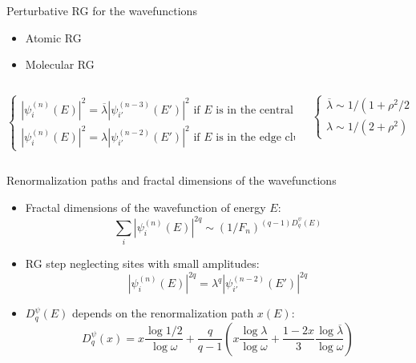 \documentclass[xcolor=x11names,compress,professionalfonts]{beamer}
\renewcommand{\(}{\begin{columns}}
\renewcommand{\)}{\end{columns}}
\newcommand{\<}[1]{\begin{column}{#1}}
\renewcommand{\>}{\end{column}}
\newcommand{\lb}{\ensuremath{\overline{\lambda}}}
\begin{document}
\begin{frame}{Perturbative RG for the wavefunctions}
	\begin{itemize}

		\item Atomic RG
			
		\item Molecular RG
			
	\end{itemize}
\begin{columns}
	\begin{column}{9cm}
	\[
	\begin{cases}
		|\psi_i^{(n)}(E)|^2 = \lb |\psi_{i'}^{(n-3)}(E')|^2 \text{~if $E$ is in the central cluster}\\
		|\psi_i^{(n)}(E)|^2 = \lambda |\psi_{i'}^{(n-2)}(E')|^2 \text{~if }E\text{~is in the edge clusters}
	\end{cases}
	\]
	\end{column}
	\begin{column}{3cm}
	\[
	\begin{cases}
		\lb \sim  1/(1+\rho^2/2) \\
		\lambda \sim 1/(2+\rho^2)
	\end{cases}
	\]
	\end{column}
\end{columns}
\end{frame}

\begin{frame}{Renormalization paths and fractal dimensions of the wavefunctions}
\begin{itemize}
	\item Fractal dimensions of the wavefunction of energy $E$:
	\[ \sum_i |\psi_i^{(n)}(E)|^{2q} \sim (1/F_n)^{(q-1)D_q^\psi(E)}  \]
	\item RG step neglecting sites with small amplitudes:
		\[ |\psi_i^{(n)}(E)|^{2q} = \lambda^q |\psi_{i'}^{(n-2)}(E')|^{2q} \]
	\item $D_q^\psi(E)$ depends on the renormalization path $x(E)$:
	\[ D_q^\psi(x) = x \frac{\log 1/2}{\log \omega} + \frac{q}{q-1} \left( x \frac{\log \lambda}{\log \omega} + \frac{1-2x}{3}\frac{\log \lb}{\log \omega} \right) \]
\end{itemize}
\end{frame}
\end{document}

